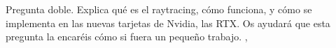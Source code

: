 
\begin{pregunta}{Pregunta doble. Explica qué es el raytracing, cómo funciona, y cómo se
    implementa en las nuevas tarjetas de Nvidia, las RTX. Os ayudará que esta
pregunta la encaréis cómo si fuera un pequeño trabajo.} \sep{}

\end{pregunta}
